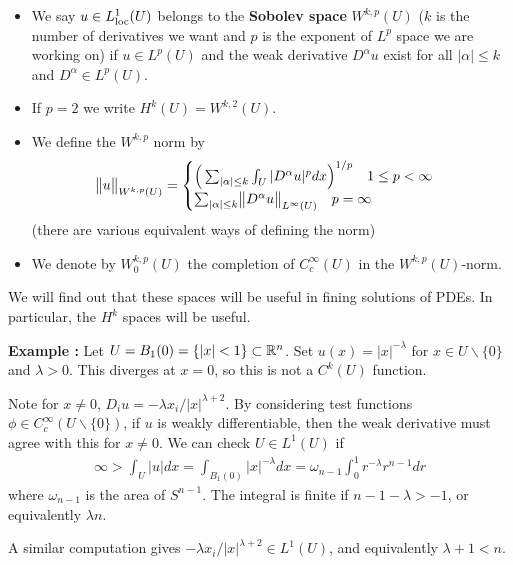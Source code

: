 \documentclass[12pt,a4paper]{report}
\begin{document}
\s
{} \begin{itemize}
\item We say $u \in L^1_{\text{loc}} (U)$ belongs to the \textbf{Sobolev space} $W^{k,p}(U)$ ($k$ is the number of derivatives we want and $p$ is the exponent of $L^p$ space we are working on) if $u\in L^p(U)$ and the weak derivative $D^{\alpha} u$ exist for all $|\alpha| \leq k$ and $D^{\alpha} \in L^p(U)$.
\item If $p=2$ we write $H^k(U) = W^{k,2}(U)$.
\item We define the $W^{k,p}$ norm by
\begin{align*}
\bigl\lVert u\bigr\rVert_{W^{k,p}(U)} = \begin{cases}
\Big( \sum_{|\alpha|\leq k} \int_U |D^{\alpha} u|^p dx \Big)^{1/p} \quad 1\leq p <\infty \\
\sum_{|\alpha|\leq k} \bigl\lVert D^{\alpha} u \bigr\rVert_{L^{\infty}(U)} \quad p =\infty
\end{cases}
\end{align*}
(there are various equivalent ways of defining the norm)
\item We denote by $W_0^{k,p}(U)$ the completion of $C_c^{\infty}(U)$ in the $W^{k,p}(U)$-norm.
\end{itemize} 
\s

We will find out that these spaces will be useful in fining solutions of PDEs. In particular, the $H^k$ spaces will be useful.
\s

\textbf{Example :} Let $U = B_1(0) = \{ |x| <1 \} \subset \mathbb{R}^n$. Set $u(x) = |x|^{-\lambda}$ for $x\in U \backslash \{0\}$ and $\lambda >0$. This diverges at $x=0$, so this is not a $C^{k}(U)$ function.

\quad Note for $x\neq 0$, $D_i u = - \lambda x_i /|x|^{\lambda +2}$. By considering test functions $\phi \in C_c^{\infty}(U \backslash \{0\})$, if $u$ is weakly differentiable, then the weak derivative must agree with this for $x\neq 0$. We can check $U\in L^1(U)$ if
\begin{align*}
\infty > \int_U |u| dx = \int_{B_1(0)} |x|^{-\lambda} dx = \omega_{n-1} \int_0^1 r^{-\lambda} r^{n-1} dr
\end{align*}
where $\omega_{n-1}$ is the area of $S^{n-1}$. The integral is finite if $n-1-\lambda >-1$, or equivalently $\lambda n$.

\quad A similar computation gives $- \lambda x_i/|x|^{\lambda +2} \in L^1(U)$, and equivalently $\lambda +1 <n$.
\end{document}
